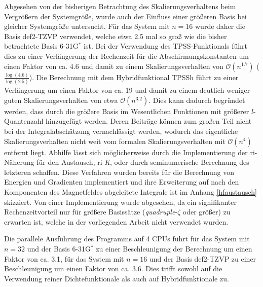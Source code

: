 \bigskip
Abgesehen von der bisherigen Betrachtung des Skalierungsverhaltens beim Vergrößern der Systemgröße, wurde auch der Einfluss einer größeren Basis bei gleicher Systemgröße untersucht. Für das System mit $n=16$ wurde daher die Basis def2-TZVP verwendet, welche etwa 2.5 mal so groß wie die bisher betrachtete Basis 6-31G$^*$ ist. Bei der Verwendung des TPSS-Funktionals führt dies zu einer Verlängerung der Rechenzeit für die Abschirmungskonstanten um einen Faktor von ca. 4.6 und damit zu einem Skalierungsverhalten von $\mathcal{O}(n^{1.7})$ ($\frac{\log(4.6)}{\log(2.5)}$). Die Berechnung mit dem Hybridfunktional TPSSh führt zu einer Verlängerung um einen Faktor von ca. 19 und damit zu einem deutlich weniger guten Skalierungsverhalten von etwa $\mathcal{O}(n^{3.2})$. Dies kann dadurch begründet werden, dass durch die größere Basis im Wesentlichen Funktionen mit größerer $l$-Quantenzahl hinzugefügt werden. Deren Beiträge können zum großen Teil nicht bei der Integralabschätzung vernachlässigt werden, wodurch das eigentliche Skalierungsverhalten nicht weit vom formalen Skalierungsverhalten mit $\mathcal{O}(n^{4})$ entfernt liegt. Abhilfe lässt sich möglicherweise durch die Implementierung der \ac{ri}-Näherung für den Austausch, \ac{ri}-\textit{K}\supercite{weigend2002fully}, oder durch seminumerische Berechnung\supercite{neese2009efficient,plessow2012seminumerical} des letzteren schaffen. Diese Verfahren wurden bereits für die Berechnung von Energien und Gradienten implementiert und ihre Erweiterung auf nach den Komponenten des Magnetfeldes abgeleitete Integrale ist im Anhang \ref{hfaustausch} skizziert. Von einer Implementierung wurde abgesehen, da ein signifikanter Rechenzeitvorteil nur für größere Basissätze (\textit{quadruple}-$\zeta$ oder größer) zu erwarten ist, welche in der vorliegenden Arbeit nicht verwendet wurden.

Die parallele Ausführung des Programms auf 4 CPUs führt für das System mit $n=32$ und der Basis 6-31G$^*$ zu einer Beschleunigung der Berechnung um einen Faktor von ca. 3.1, für das System mit $n=16$ und der Basis def2-TZVP zu einer Beschleunigung um einen Faktor von ca. 3.6. Dies trifft sowohl auf die Verwendung reiner Dichtefunktionale als auch auf Hybridfunktionale zu.

